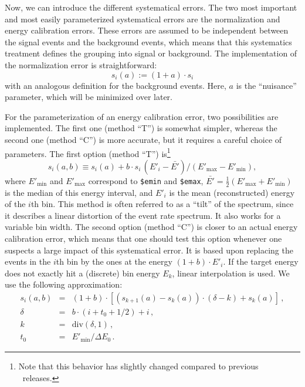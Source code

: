 Now, we can introduce the different systematical errors. 
The two most important and
most easily parameterized systematical errors are the normalization 
and energy calibration errors. These errors are assumed to be independent between the signal events and the background events, which means that
this systematics treatment defines the grouping into signal or background.
The implementation of the normalization error
is straightforward:
\begin{equation}
s_i(a):=(1+a)\cdot s_i
\end{equation} 
with an analogous definition for the background events. Here, $a$ is the ``nuisance'' parameter, which will be minimized over later.

For the parameterization of an energy calibration error, two possibilities
are implemented. The first one (method ``T'') is somewhat simpler, 
whereas the second one (method ``C'')
is more accurate, but it requires a careful choice of parameters. 
The first option (method ``T'') is\footnote{Note that this behavior
has slightly changed compared to previous \GLOBES\ releases.}
\begin{equation}
  s_i(a,b) \equiv s_i(a)+b\cdot s_i \, (E'_i - \bar{E'}) / (E'_\mathrm{max}-E'_\mathrm{min}),
\end{equation}
where $E'_\mathrm{min}$ and $E'_\mathrm{max}$ correspond to {\tt \$emin} and
{\tt \$emax}, $\bar{E'} = \tfrac{1}{2} (E'_\mathrm{max}+E'_\mathrm{min})$ is
the median of this energy interval, and $E'_i$ is the mean (reconstructed)
energy of the $i$th bin.
This method is often referred to as a ``tilt'' of the
spectrum, since it describes a linear distortion 
of the event rate spectrum. It also works for a variable bin width.
%
The second option (method ``C'') is closer to an actual energy
calibration error, which means that one should test this option whenever
one suspects a large impact of this systematical error.
It is based upon replacing the events in the $i$th bin
by the ones at the energy $(1+b)\cdot E'_i$. If the target energy does not exactly hit
a (discrete) bin energy $E_k$, linear interpolation is used. We use the following approximation:
\begin{eqnarray}
s_i(a,b)&=& (1+b)\cdot \left[ \left( s_{k+1}(a)-s_k(a) \right)\cdot (\delta-k) +s_k(a) \right] \,,
  \label{eq:Ecalib} \\
\delta&=&b\cdot(i+t_0+ 1/2)+i\,,\nonumber\\
k&=& \mathrm{div}(\delta,1)\,,\nonumber\\
t_0&=&E'_\mathrm{min}/\Delta E_0\,.\nonumber
\end{eqnarray}
